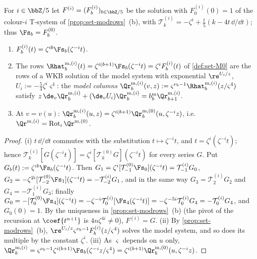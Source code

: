\begin{lem}
\label{lem:gau-colmod}
For $i\in\bbZ/5$ let $F^{(i)}=(F^{(i)}_b)_{b\in\bbZ/5}$ be the solution with $F^{(i)}_0(0)=1$ of the colour-$i$ T-system of \cref{prop:set-modrows}~(b), with $\mathcal T^{(i)}_k=-\zeta^i+\frac t5(k-4t\,\dd/\dd t)$; thus $\Fs_b=F^{(0)}_b$.
\begin{enumerate}
\item $F^{(i)}_b(t)=\zeta^{ib}\Fs_b(\zeta^{-i}t)$.
\item The rows $\Rhat^{\mathrm m,(i)}_b(t)=\zeta^{i(b+1)}\Fs_b(\zeta^{-i}t)=\zeta^iF^{(i)}_b(t)$ of \cref{def:set-M0} are the rows of a WKB solution of the model system with exponential $\re^{U_i/z}$, $U_i:=-\frac54\zeta^i\varsigma^4$: the \emph{model columns} $\Qr^{\mathrm m,(i)}_b(v,z):=\varsigma^{\nu_b-1}\Rhat^{\mathrm m,(i)}_b(z/\varsigma^4)$ satisfy $z\,\de_v\Qr^{\mathrm m,(i)}_b+(\de_vU_i)\Qr^{\mathrm m,(i)}_b=b^{\mathrm m}_b\Qr^{\mathrm m,(i)}_{b+1}$.
\item At $v=v(u)$: $\Qr^{\mathrm m,(i)}_b(u,z)=\zeta^{i(b+1)}\Qr^{\mathrm m,(0)}_b(u,\zeta^{-i}z)$, i.e.\ $\Qr^{\mathrm m,(i)}=\operatorname{Rot}_i\Qr^{\mathrm m,(0)}$.
\end{enumerate}
\end{lem}

\begin{proof}
(i) $t\,\dd/\dd t$ commutes with the substitution $t\mapsto\zeta^{-i}t$, and $t=\zeta^i(\zeta^{-i}t)$; hence $\mathcal T^{(i)}_k[G(\zeta^{-i}t)]=\zeta^i[\mathcal T^{(0)}_kG](\zeta^{-i}t)$ for every series $G$. Put $G_b(t):=\zeta^{ib}\Fs_b(\zeta^{-i}t)$. Then $G_1=\zeta^i[\mathcal T^{(0)}_{-1}\Fs_0](\zeta^{-i}t)=\mathcal T^{(i)}_{-1}G_0$, $G_2=-\zeta^{2i}[\mathcal T^{(0)}_{-2}\Fs_1](\zeta^{-i}t)=-\mathcal T^{(i)}_{-2}G_1$, and in the same way $G_3=\mathcal T^{(i)}_2G_2$ and $G_4=-\mathcal T^{(i)}_1G_3$; finally $G_0=-[\mathcal T^{(0)}_0\Fs_4](\zeta^{-i}t)=-\zeta^{-i}\mathcal T^{(i)}_0[\Fs_4(\zeta^{-i}t)]=-\zeta^{-5i}\mathcal T^{(i)}_0G_4=-\mathcal T^{(i)}_0G_4$, and $G_0(0)=1$. By the uniqueness in \cref{prop:set-modrows}~(b) (the pivot of the recursion at $\coef{t^{n+1}}$ is $4n\zeta^{4i}\neq0$), $F^{(i)}=G$. (ii) By \cref{prop:set-modrows}~(b), $\re^{U_i/z}\varsigma^{\nu_b-1}F^{(i)}_b(z/\varsigma^4)$ solves the model system, and so does its multiple by the constant $\zeta^i$. (iii) As $\varsigma$ depends on $u$ only, $\Qr^{\mathrm m,(i)}_b=\varsigma^{\nu_b-1}\zeta^{i(b+1)}\Fs_b(\zeta^{-i}z/\varsigma^4)=\zeta^{i(b+1)}\Qr^{\mathrm m,(0)}_b(u,\zeta^{-i}z)$.
\end{proof}


